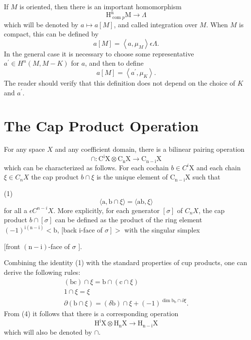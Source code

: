 \documentclass[10pt]{article}
\begin{document}
If $M$ is oriented, then there is an important homomorphism
$$
\mathrm{H}_{\operatorname{com} p}^{\mathrm{n}} \mathrm{M} \rightarrow \Lambda
$$
which will be denoted by $a \mapsto a[M]$, and called integration over $M$. When $M$ is compact, this can be defined by
$$
a[M]=\left\langle a, \mu_{M}\right\rangle \epsilon \Lambda .
$$
In the general case it is necessary to choose some representative $a^{\prime} \in H^{n}(M, M-K)$ for $a$, and then to define
$$
a[M]=\left\langle a^{\prime}, \mu_{K}\right\rangle .
$$
The reader should verify that this definition does not depend on the choice of $K$ and $a^{\prime}$.

\section{The Cap Product Operation}
For any space $X$ and any coefficient domain, there is a bilinear pairing operation
$$
\cap: \mathrm{C}^{\mathrm{i}} \mathrm{X} \otimes \mathrm{C}_{\mathrm{n}} \mathrm{X} \rightarrow \mathrm{C}_{\mathrm{n}-\mathrm{i}} \mathrm{X}
$$
which can be characterized as follows. For each cochain $b \in C^{i} \mathrm{X}$ and each chain $\xi \in C_{n} X$ the cap product $b \cap \xi$ is the unique element of $\mathrm{C}_{\mathrm{n}-\mathrm{i}} \mathrm{X}$ such that

(1)
$$
\langle\mathrm{a}, \mathrm{b} \cap \xi\rangle=\langle\mathrm{ab}, \xi\rangle
$$
for all a $\epsilon C^{n-i} X$. More explicitly, for each generator $[\sigma]$ of $C_{n} X$, the cap product $b \cap[\sigma]$ can be defined as the product of the ring element $(-1)^{\mathrm{i}(\mathrm{n}-\mathrm{i})}<\mathrm{b}$, [back i-face of $\left.\sigma\right]>$ with the singular simplex

[front $(\mathrm{n}-\mathrm{i})$-face of $\sigma$ ].

Combining the identity (1) with the standard properties of cup products, one can derive the following rules:
$$
\begin{gathered}
(\mathrm{bc}) \cap \xi=\mathrm{b} \cap(\mathrm{c} \cap \xi) \\
1 \cap \xi=\xi \\
\partial(\mathrm{b} \cap \xi)=(\delta \mathrm{b}) \cap \xi+(-1)^{\operatorname{dim} \mathrm{b}_{\mathrm{b}} \cap \partial \xi} .
\end{gathered}
$$
From (4) it follows that there is a corresponding operation
$$
\mathrm{H}^{\mathrm{i}} \mathrm{X} \otimes \mathrm{H}_{\mathrm{n}} \mathrm{X} \rightarrow \mathrm{H}_{\mathrm{n}-\mathrm{i}} \mathrm{X}
$$
which will also be denoted by $\cap$.
\end{document}
